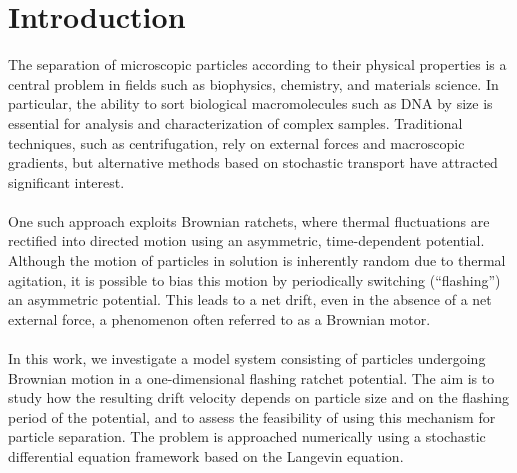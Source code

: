 \section{Introduction}


The separation of microscopic particles according to their physical properties is a central problem in fields such as biophysics, chemistry, and materials science. In particular, the ability to sort biological macromolecules such as DNA by size is essential for analysis and characterization of complex samples. Traditional techniques, such as centrifugation, rely on external forces and macroscopic gradients, but alternative methods based on stochastic transport have attracted significant interest.
\\ \\
One such approach exploits Brownian ratchets, where thermal fluctuations are rectified into directed motion using an asymmetric, time-dependent potential. Although the motion of particles in solution is inherently random due to thermal agitation, it is possible to bias this motion by periodically switching (“flashing”) an asymmetric potential. This leads to a net drift, even in the absence of a net external force, a phenomenon often referred to as a Brownian motor.
\\ \\
In this work, we investigate a model system consisting of particles undergoing Brownian motion in a one-dimensional flashing ratchet potential. The aim is to study how the resulting drift velocity depends on particle size and on the flashing period of the potential, and to assess the feasibility of using this mechanism for particle separation. The problem is approached numerically using a stochastic differential equation framework based on the Langevin equation.